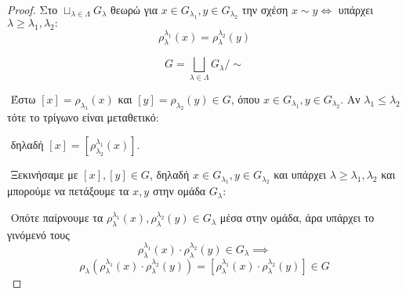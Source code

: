 \begin{proof}
    Στο $\sqcup_{\lambda \in \Lambda} G_{\lambda}$ θεωρώ για $x \in G_{\lambda_1}, y \in G_{\lambda_2} $  την σχέση $x\sim y \iff$ υπάρχει $\lambda \geq \lambda_1,\lambda_2:$
    $$\rho^{\lambda_1}_{\lambda}(x) = \rho^{\lambda_2}_{\lambda}(y)$$


    $$G = \bigsqcup\limits_{\lambda\in \Lambda} G_{\lambda} \Big/ \sim$$

    $ $\newline
    Έστω $[x] = \rho_{\lambda_1}(x)$ και $[y] =\rho_{\lambda_2}(y) \in G$, όπου $x \in G_{\lambda_1}, y \in G_{\lambda_2}$. Αν $\lambda_1\leq \lambda_2$ τότε το τρίγωνο είναι μεταθετικό:

    \begin{figure}[H]
        \centering
    \end{figure}

    $ $\newline
    δηλαδή $[x] = [\rho^{\lambda_1}_{\lambda_2} (x) ]$.

    $ $\newline
    Ξεκινήσαμε με $[x],[y] \in G$, δηλαδή $x \in G_{\lambda_1}, y \in G_{\lambda_2}$ και υπάρχει $\lambda \geq \lambda_1, \lambda_2$ και μπορούμε να πετάξουμε τα $x,y$ στην ομάδα $G_{\lambda}$:
    
    \begin{figure}[H]
        \centering
    \end{figure}

    $ $\newline
    Οπότε παίρνουμε τα $\rho^{\lambda_1}_{\lambda}(x), \rho^{\lambda_2}_{\lambda}(y) \in G_{\lambda}$ μέσα στην ομάδα, άρα υπάρχει το γινόμενό τους
    $$\rho^{\lambda_1}_{\lambda}(x) \cdot \rho^{\lambda_2}_{\lambda} (y) \in G_{\lambda} \implies$$
    $$\rho_{\lambda}(\rho^{\lambda_1}_{\lambda}(x) \cdot \rho^{\lambda_2}_{\lambda} (y)) = [\rho^{\lambda_1}_{\lambda}(x) \cdot \rho^{\lambda_2}_{\lambda} (y)] \in G$$


\end{proof}
